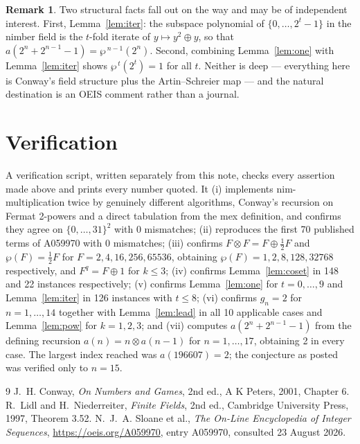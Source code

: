 \documentclass[11pt,a4paper]{article}
\theoremstyle{plain}
\theoremstyle{definition}
\newtheorem{remark}[theorem]{Remark}
\begin{document}
\begin{remark}
Two structural facts fall out on the way and may be of independent interest. First,
Lemma~\ref{lem:iter}: the subspace polynomial of $\{0,\dots,2^{t}-1\}$ in the nimber field
is the $t$-fold iterate of $y\mapsto y^{2}\oplus y$, so that
$a(2^{n}+2^{n-1}-1)=\wp^{\,n-1}(2^{n})$. Second, combining Lemma~\ref{lem:one} with
Lemma~\ref{lem:iter} shows $\wp^{\,t}(2^{t})=1$ for all $t$. Neither is deep ---
everything here is Conway's field structure plus the Artin--Schreier map --- and the
natural destination is an OEIS comment rather than a journal.
\end{remark}

\section{Verification}

A verification script, written separately from this note, checks every assertion made above
and prints every number quoted. It (i) implements nim-multiplication twice by genuinely
different algorithms, Conway's recursion on Fermat 2-powers and a direct tabulation from
the mex definition, and confirms they agree on $\{0,\dots,31\}^{2}$ with 0 mismatches;
(ii) reproduces the first 70 published terms of A059970 with 0 mismatches; (iii) confirms
$F\otimes F=F\oplus\tfrac12F$ and $\wp(F)=\tfrac12F$ for $F=2,4,16,256,65536$, obtaining
$\wp(F)=1,2,8,128,32768$ respectively, and $F^{q}=F\oplus1$ for $k\le3$; (iv) confirms
Lemma~\ref{lem:coset} in 148 and 22 instances respectively; (v) confirms
Lemma~\ref{lem:one} for $t=0,\dots,9$ and Lemma~\ref{lem:iter} in 126 instances with
$t\le8$; (vi) confirms $g_{n}=2$ for $n=1,\dots,14$ together with Lemma~\ref{lem:lead} in
all 10 applicable cases and Lemma~\ref{lem:pow} for $k=1,2,3$; and (vii) computes
$a(2^{n}+2^{n-1}-1)$ from the defining recursion $a(n)=n\otimes a(n-1)$ for
$n=1,\dots,17$, obtaining 2 in every case. The largest index reached was $a(196607)=2$; the
conjecture as posted was verified only to $n=15$.

\begin{thebibliography}{9}
 J.~H. Conway, \emph{On Numbers and Games}, 2nd ed., A K Peters, 2001,
Chapter 6.
 R.~Lidl and H.~Niederreiter, \emph{Finite Fields}, 2nd ed., Cambridge
University Press, 1997, Theorem 3.52.
 N.~J.~A. Sloane et al., \emph{The On-Line Encyclopedia of Integer
Sequences}, \url{https://oeis.org/A059970}, entry A059970, consulted 23 August 2026.
\end{thebibliography}
\end{document}

